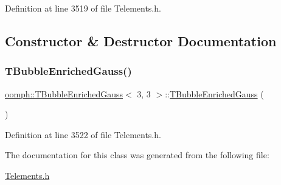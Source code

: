 Definition at line 3519 of file Telements.\+h.



\subsection{Constructor \& Destructor Documentation}
\mbox{\label{classoomph_1_1TBubbleEnrichedGauss_3_013_00_013_01_4_a608a928a0d4f296846f954af580dbbce}} 
\subsubsection{\texorpdfstring{T\+Bubble\+Enriched\+Gauss()}{TBubbleEnrichedGauss()}}
{\footnotesize\ttfamily \hyperlink{classoomph_1_1TBubbleEnrichedGauss}{oomph\+::\+T\+Bubble\+Enriched\+Gauss}$<$ 3, 3 $>$\+::\hyperlink{classoomph_1_1TBubbleEnrichedGauss}{T\+Bubble\+Enriched\+Gauss} (\begin{DoxyParamCaption}{ }\end{DoxyParamCaption})\hspace{0.3cm}{\ttfamily [inline]}}



Definition at line 3522 of file Telements.\+h.



The documentation for this class was generated from the following file\+:\begin{DoxyCompactItemize}
\item 
\hyperlink{Telements_8h}{Telements.\+h}\end{DoxyCompactItemize}
